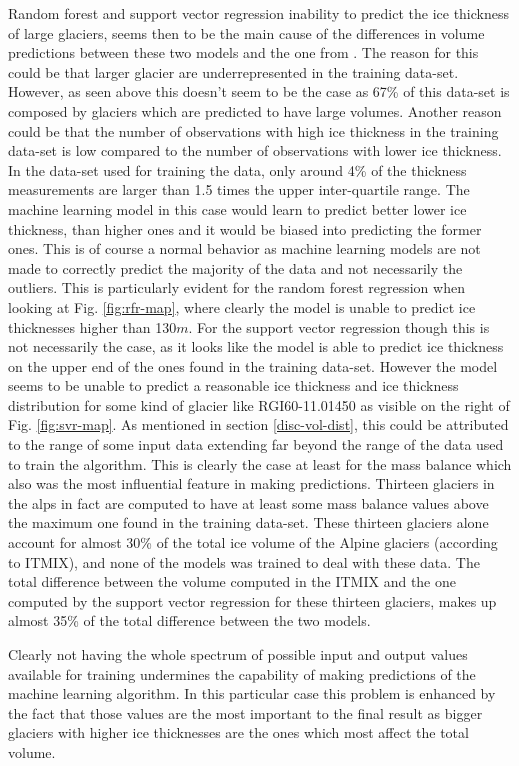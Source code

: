 Random forest and support vector regression inability to predict the ice thickness of large glaciers, seems then to be the main cause of the differences in volume predictions between these two models and the one from \citet{Farinotti2019}.
The reason for this could be that larger glacier are underrepresented in the training data-set. However, as seen above this doesn't seem to be the case as 67\% of this data-set is composed by glaciers which are predicted to have large volumes.
Another reason could be that the number of observations with high ice thickness in the training data-set is low compared to the number of observations with lower ice thickness. In the data-set used for training the data, only around 4\% of the thickness measurements are larger than 1.5 times the upper inter-quartile range. The machine learning model in this case would learn to predict better lower ice thickness, than higher ones and it would be biased into predicting the former ones. This is of course a normal behavior as machine learning models are not made to correctly predict the majority of the data and not necessarily the outliers. This is particularly evident for the random forest regression when looking at Fig. \ref{fig:rfr-map}, where clearly the model is unable to predict ice thicknesses higher than 130$m$.
For the support vector regression though this is not necessarily the case, as it looks like the model is able to predict ice thickness on the upper end of the ones found in the training data-set. However the model seems to be unable to predict a reasonable ice thickness and ice thickness distribution for some kind of glacier like RGI60-11.01450 as visible on the right of Fig. \ref{fig:svr-map}. As mentioned in section \ref{disc-vol-dist}, this could be attributed to the range of some input data extending far beyond the range of the data used to train the algorithm. This is clearly the case at least for the mass balance which also was the most influential feature in making predictions. Thirteen glaciers in the alps in fact are computed to have at least some mass balance values above the maximum one found in the training data-set. These thirteen glaciers alone account for almost 30\% of the total ice volume of the Alpine glaciers (according to ITMIX), and none of the models was trained to deal with these data. The total difference between the volume computed in the ITMIX and the one computed by the support vector regression for these thirteen glaciers, makes up almost 35\% of the total difference between the two models.
 
Clearly not having the whole spectrum of possible input and output values available for training undermines the capability of making predictions of the machine learning algorithm. In this particular case this problem is enhanced by the fact that those values are the most important to the final result as bigger glaciers with higher ice thicknesses are the ones which most affect the total volume. 


